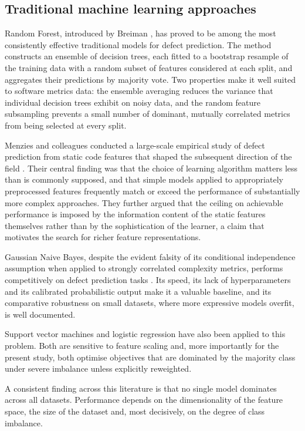 \documentclass[12pt,a4paper,oneside]{report}
\begin{document}
\subsection{Traditional machine learning approaches}

Random Forest, introduced by Breiman \cite{breiman2001}, has proved to be among the most consistently effective traditional models for defect prediction. The method constructs an ensemble of decision trees, each fitted to a bootstrap resample of the training data with a random subset of features considered at each split, and aggregates their predictions by majority vote. Two properties make it well suited to software metrics data: the ensemble averaging reduces the variance that individual decision trees exhibit on noisy data, and the random feature subsampling prevents a small number of dominant, mutually correlated metrics from being selected at every split.

Menzies and colleagues conducted a large-scale empirical study of defect prediction from static code features that shaped the subsequent direction of the field \cite{menzies2010}. Their central finding was that the choice of learning algorithm matters less than is commonly supposed, and that simple models applied to appropriately preprocessed features frequently match or exceed the performance of substantially more complex approaches. They further argued that the ceiling on achievable performance is imposed by the information content of the static features themselves rather than by the sophistication of the learner, a claim that motivates the search for richer feature representations.

Gaussian Naive Bayes, despite the evident falsity of its conditional independence assumption when applied to strongly correlated complexity metrics, performs competitively on defect prediction tasks \cite{menzies2010}. Its speed, its lack of hyperparameters and its calibrated probabilistic output make it a valuable baseline, and its comparative robustness on small datasets, where more expressive models overfit, is well documented.

Support vector machines and logistic regression have also been applied to this problem. Both are sensitive to feature scaling and, more importantly for the present study, both optimise objectives that are dominated by the majority class under severe imbalance unless explicitly reweighted.

A consistent finding across this literature is that no single model dominates across all datasets. Performance depends on the dimensionality of the feature space, the size of the dataset and, most decisively, on the degree of class imbalance.
\end{document}
